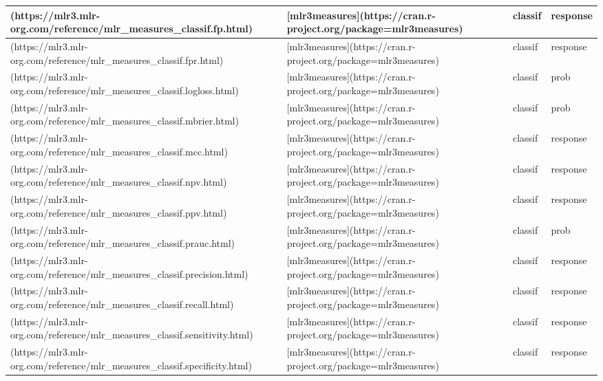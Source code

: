 \documentclass[
]{scrbook}
\begin{document}
\begin{tabular}{l|l|l|l}
\hline
[`classif.fp`](https://mlr3.mlr-org.com/reference/mlr\_measures\_classif.fp.html) & [mlr3measures](https://cran.r-project.org/package=mlr3measures) & classif & response\\
\hline
[`classif.fpr`](https://mlr3.mlr-org.com/reference/mlr\_measures\_classif.fpr.html) & [mlr3measures](https://cran.r-project.org/package=mlr3measures) & classif & response\\
\hline
[`classif.logloss`](https://mlr3.mlr-org.com/reference/mlr\_measures\_classif.logloss.html) & [mlr3measures](https://cran.r-project.org/package=mlr3measures) & classif & prob\\
\hline
[`classif.mbrier`](https://mlr3.mlr-org.com/reference/mlr\_measures\_classif.mbrier.html) & [mlr3measures](https://cran.r-project.org/package=mlr3measures) & classif & prob\\
\hline
[`classif.mcc`](https://mlr3.mlr-org.com/reference/mlr\_measures\_classif.mcc.html) & [mlr3measures](https://cran.r-project.org/package=mlr3measures) & classif & response\\
\hline
[`classif.npv`](https://mlr3.mlr-org.com/reference/mlr\_measures\_classif.npv.html) & [mlr3measures](https://cran.r-project.org/package=mlr3measures) & classif & response\\
\hline
[`classif.ppv`](https://mlr3.mlr-org.com/reference/mlr\_measures\_classif.ppv.html) & [mlr3measures](https://cran.r-project.org/package=mlr3measures) & classif & response\\
\hline
[`classif.prauc`](https://mlr3.mlr-org.com/reference/mlr\_measures\_classif.prauc.html) & [mlr3measures](https://cran.r-project.org/package=mlr3measures) & classif & prob\\
\hline
[`classif.precision`](https://mlr3.mlr-org.com/reference/mlr\_measures\_classif.precision.html) & [mlr3measures](https://cran.r-project.org/package=mlr3measures) & classif & response\\
\hline
[`classif.recall`](https://mlr3.mlr-org.com/reference/mlr\_measures\_classif.recall.html) & [mlr3measures](https://cran.r-project.org/package=mlr3measures) & classif & response\\
\hline
[`classif.sensitivity`](https://mlr3.mlr-org.com/reference/mlr\_measures\_classif.sensitivity.html) & [mlr3measures](https://cran.r-project.org/package=mlr3measures) & classif & response\\
\hline
[`classif.specificity`](https://mlr3.mlr-org.com/reference/mlr\_measures\_classif.specificity.html) & [mlr3measures](https://cran.r-project.org/package=mlr3measures) & classif & response\\

\end{tabular}
\end{document}
